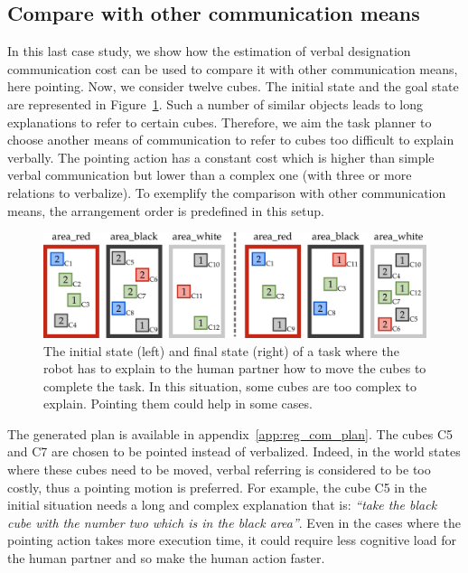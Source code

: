 \subsection{Compare with other communication means}

In this last case study, we show how the estimation of verbal designation communication cost can be used to compare it with other communication means, here pointing. Now, we consider twelve cubes. The initial state and the goal state are represented in Figure~\ref{fig:chap5_case3}. Such a number of similar objects leads to long explanations to refer to certain cubes. Therefore, we aim the task planner to choose another means of communication to refer to cubes too difficult to explain verbally. The pointing action has a constant cost which is higher than simple verbal communication but lower than a complex one (with three or more relations to verbalize). To exemplify the comparison with other communication means, the arrangement order is predefined in this setup.

\begin{figure}[!ht]
\centering
\includegraphics[width=\textwidth]{figures/chapter5/results_case3.png}
\caption{\label{fig:chap5_case3} The initial state (left) and final state (right) of a task where the robot has to explain to the human partner how to move the cubes to complete the task. In this situation, some cubes are too complex to explain. Pointing them could help in some cases. }
\end{figure}
 
The generated plan is available in appendix~\ref{app:reg_com_plan}. The cubes C5 and C7 are chosen to be pointed instead of verbalized. Indeed, in the world states where these cubes need to be moved, verbal referring is considered to be too costly, thus a pointing motion is preferred. For example, the cube C5 in the initial situation needs a long and complex explanation that is: \textit{``take the black cube with the number two which is in the black area''}. Even in the cases where the pointing action takes more execution time, it could require less cognitive load for the human partner and so make the human action faster.

